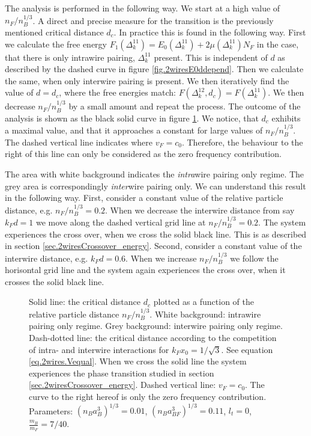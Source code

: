 The analysis is performed in the following way. We start at a high value of $n_F/n_B^{1/3}$. A direct and precise measure for the transition is the previously mentioned critical distance $d_c$. In practice this is found in the following way. First we calculate the free energy $F_1(\Delta^{11}_k) = E_0(\Delta^{11}_k) + 2 \mu (\Delta^{11}_k) N_F$ in the case, that there is only intrawire pairing, $\Delta^{11}_k$ present. This is independent of $d$ as described by the dashed curve in figure \ref{fig.2wiresE0ddepend}. Then we calculate the same, when only interwire pairing is present. We then iteratively find the value of $d = d_c$, where the free energies match: $F(\Delta^{12}_k, d_c) = F(\Delta^{11}_k)$. We then decrease $n_F/n_B^{1/3}$ by a small amount and repeat the process. The outcome of the analysis is shown as the black solid curve in figure \ref{fig.twowirescrossovernBdepend}. We notice, that $d_c$ exhibits a maximal value, and that it approaches a constant for large values of $n_F/n_B^{1/3}$. The dashed vertical line indicates where $v_F = c_0$. Therefore, the behaviour to the right of this line can only be considered as the zero frequency contribution. 

The area with white background indicates the \textit{intra}wire pairing only regime. The grey area is correspondingly \textit{inter}wire pairing only. We can understand this result in the following way. First, consider a constant value of the relative particle distance, e.g. $n_F/n_B^{1/3} = 0.2$. When we decrease the interwire distance from say $k_Fd = 1$ we move along the dashed vertical grid line at $n_F/n_B^{1/3} = 0.2$. The system experiences the cross over, when we cross the solid black line. This is as described in section \ref{sec.2wiresCrossover_energy}. Second, consider a constant value of the interwire distance, e.g. $k_Fd = 0.6$. When we increase $n_F/n_B^{1/3}$ we follow the horisontal grid line and the system again experiences the cross over, when it crosses the solid black line. 

\begin{figure} 
\begin{center}  
  
\caption{Solid line: the critical distance $d_c$ plotted as a function of the relative particle distance $n_F/n_B^{1/3}$. White background: intrawire pairing only regime. Grey background: interwire pairing only regime. Dash-dotted line: the critical distance according to the competition of intra- and interwire interactions for $k_Fx_0 = 1/\sqrt{3}$. See equation \eqref{eq.2wires.Vequal}. When we cross the solid line the system experiences the phase transition studied in section \ref{sec.2wiresCrossover_energy}. Dashed vertical line: $v_F = c_0$. The curve to the right hereof is only the zero frequency contribution. Parameters: $(n_Ba_B^3)^{1/3} = 0.01$, $(n_Ba_{BF}^3)^{1/3} = 0.11$, $l_t = 0$, $\frac{m_B}{m_F} = 7/40$. }  
\label{fig.twowirescrossovernBdepend}  
\end{center}    
\end{figure}

